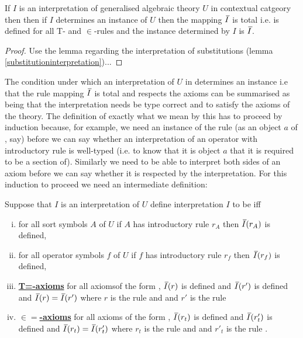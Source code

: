 \begin{lemma} 
If $I$ is an interpretation of generalised algebraic theory $U$ in contextual catgeory \catcw then then if $I$ determines an instance of $U$ then the
mapping $\Ibar$  is total i.e. is defined for all T- and $\in$-rules and the instance determined by $I$ is $\Ibar$.
\end{lemma}
\begin{proof}  
Use the lemma regarding the interpretation of substitutions (lemma \ref{substitutioninterpretation})...
\end{proof}

The condition under which an interpretation of $U$ in \catcw determines an instance i.e that the rule mapping $\Ibar$ is total and respects the axioms can be summarised as being that the interpretation needs be type correct and to satisfy the axioms of the theory. The definition of exactly what we mean by this has to proceed by induction because, for example, we need an instance of the rule
 (as an object $a$ of \catc, say) before we can say whether an interpretation of an operator with introductory rule \genericfintroductoryrule
is well-typed (i.e. to know that it is object $a$ that it is required to be a section of).
Similarly we need to be able to interpret both sides of an axiom before we can say whether it is respected
by the interpretation. For this induction to proceed we need an intermediate definition:

\def\restrict{\mathbin{\restriction}}
\newcommand{\predInstance}{\overline{I \restrict U_p}}
\newcommand{\Uincrement}{U \setminus\kern-2pt U_p}

\begin{definition}
 Suppose that $I$ is an interpretation of $U$  
define interpretation $I$ to be   iff 

\begin{enumerate}[(i)]
\item
for all sort symbols $A$ of $U$ if $A$ has introductory rule $r_A$ then $\Ibar(r_A)$ is defined,
\item  
for all operator symbols $f$ of $U$ if $f$ has introductory rule $r_f$ then $\Ibar(r_f)$ is defined,

\item \underline{\textbf{T=-axioms}} 
for all axiomsof the form
 ,
$\Ibar(r)$ is defined and $\Ibar(r')$ is defined and
$\Ibar(r) = \Ibar(r')$ where $r$ is the rule
 and  
and $r'$ is the rule 

\item \underline{\textbf{$\boldsymbol{\in=}$-axioms}} 
for all axioms  of the form
,
$\Ibar(r_t)$ is defined and  $\Ibar(r'_t)$ is defined and
$\Ibar(r_t) = \Ibar(r'_t)$ where $r_t$ is the rule
 and  
and $r'_t$ is the rule .
\end{enumerate}
\end{definition}


